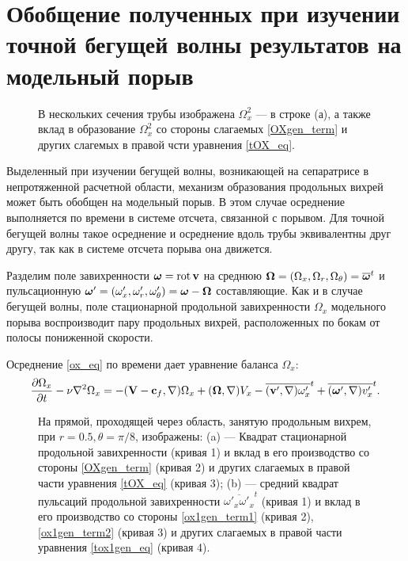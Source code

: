 \section{Обобщение полученных при изучении точной бегущей волны результатов на модельный порыв}


\begin{figure}
\caption{В нескольких сечения трубы изображена $\Omega_x^2$ --- в строке (а), а также вклад в образование $\Omega_x^2$ со стороны слагаемых \eqref{OXgen_term} и других слагемых в правой чсти уравнения \eqref{tOX_eq}.}
\label{puff_OXgen_pic}
\end{figure}


Выделенный при изучении бегущей волны, возникающей на сепаратрисе в непротяженной расчетной области, механизм образования продольных вихрей может быть обобщен на модельный порыв. В этом случае осреднение выполняется по времени в системе отсчета, связанной с порывом. Для точной бегущей волны такое осреднение и осреднение вдоль трубы эквивалентны друг другу, так как в системе отсчета порыва она движется. 

Разделим поле завихренности $\mbox{\boldmath$\omega$} = \operatorname{rot} \mathbf{v}$ на среднюю $\mbox{\boldmath$\Omega$} = (\Omega_x, \Omega_r, \Omega_\theta) = \overline{\mbox{\boldmath$\omega$}}^t$ и пульсационную $\mbox{\boldmath$\omega$}' = (\omega'_x, \omega'_r, \omega'_\theta) = \mbox{\boldmath$\omega$} - \mbox{\boldmath$\Omega$}$ составляющие. Как и в случае бегущей волны, поле стационарной продольной завихренности $\Omega_x$ модельного порыва воспроизводит пару продольных вихрей, расположенных по бокам от полосы пониженной скорости. 



Осреднение \eqref{ox_eq} по времени дает уравнение баланса $\Omega_x$: 
\begin{equation} \label{tOX_eq}
\frac{\partial \Omega_x}{\partial t} - \nu\nabla^2 \Omega_x = - (\mathbf{V} - \mathbf{c}_f, \nabla) \Omega_x + (\mbox{\boldmath$\Omega$}, \nabla) V_x - \overline{(\mathbf{v}', \nabla) \omega'_x}^t + \overline{ (\mbox{\boldmath$\omega$}', \nabla) v'_x }^t.
\end{equation}

\begin{figure}
\caption{На прямой, проходящей через область, занятую продольным вихрем, при $r = 0.5, \theta = \pi/8$, изображены: (a) --- Квадрат стационарной продольной завихренности (кривая 1) и вклад в его производство со стороны \eqref{OXgen_term} (кривая  2) и других слагаемых в правой части уравнения \eqref{tOX_eq} (кривая  3); (b) --- средний квадрат пульсаций продольной завихренности $\overline{\omega'_x \omega'_x}^t$ (кривая 1) и вклад в его производство со стороны \eqref{ox1gen_term1} (кривая  2), \eqref{ox1gen_term2} (кривая  3) и других слагаемых в правой части уравнения \eqref{tox1gen_eq} (кривая  4).}
\label{xline_oxgen_pic}
\end{figure}


